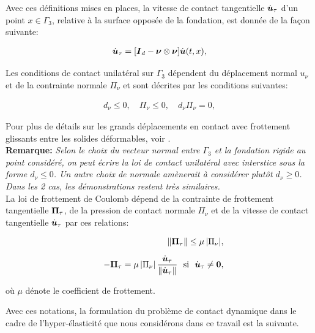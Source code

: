 Avec ces définitions mises en places, la vitesse de contact tangentielle $\dot{\mbox{\boldmath{$u$}}}_\tau$ d'un point $x\in \Gamma_3$, relative à la surface opposée de la fondation, est donnée de la façon suivante:

\begin{eqnarray*}
\dot{\mbox{\boldmath{$u$}}}_\tau=[\mbox{\boldmath{$I$}}_d-\mbox{\boldmath{$\nu$}} \otimes \mbox{\boldmath{$\nu$}}]\dot{\mbox{\boldmath{$u$}}} (t,x),
\end{eqnarray*}

Les conditions de contact unilatéral sur $\Gamma_3$ dépendent du déplacement normal $u_\nu$ et de la contrainte normale $\Pi_\nu$ et sont décrites par les conditions suivantes:

\begin{eqnarray}
d_{\nu}\le 0,\quad \Pi_\nu\le 0, \quad d_{\nu}\Pi_\nu=0,
\end{eqnarray}

Pour plus de détails sur les grands déplacements en contact avec frottement glissants entre les solides déformables, voir \cite{poulios2015unconstrained}.\\

{\bf Remarque:} \textit{Selon le choix du vecteur normal entre $\Gamma_3$ et la fondation rigide au point considéré, on peut écrire la loi de contact unilatéral avec interstice sous la forme  $d_{\nu}\le 0$. Un autre choix de normale amènerait à considérer plutôt  $d_{\nu}\ge 0$. Dans les 2 cas, les démonstrations restent très similaires.}\\

La loi de frottement de Coulomb dépend de la contrainte de frottement tangentielle $\mbox{\boldmath{$\Pi$}}_\tau $, de la pression de contact normale $\Pi_\nu$ et de la vitesse de contact tangentielle $ \dot {\mbox{\boldmath{$u$}}}_{\tau}$ par ces relations:

\begin{eqnarray}
&& \|\bPi_\tau\|\le\mu\,|\Pi_\nu|,\\[2mm]
&& -\bPi_\tau=\mu\,|\Pi_\nu|\,\frac{{\dot\bu}_\tau}{\|{\dot\bu}_\tau\|} \ \ {\rm si}\ \ \dot{\bu}_\tau\ne\bzero,
\end{eqnarray}

\noindent où $\mu$ dénote le coefficient de frottement.

\noindent Avec ces notations, la formulation du problème de contact dynamique dans le cadre de l'hyper-élasticité que nous considérons dans ce travail est la suivante.

